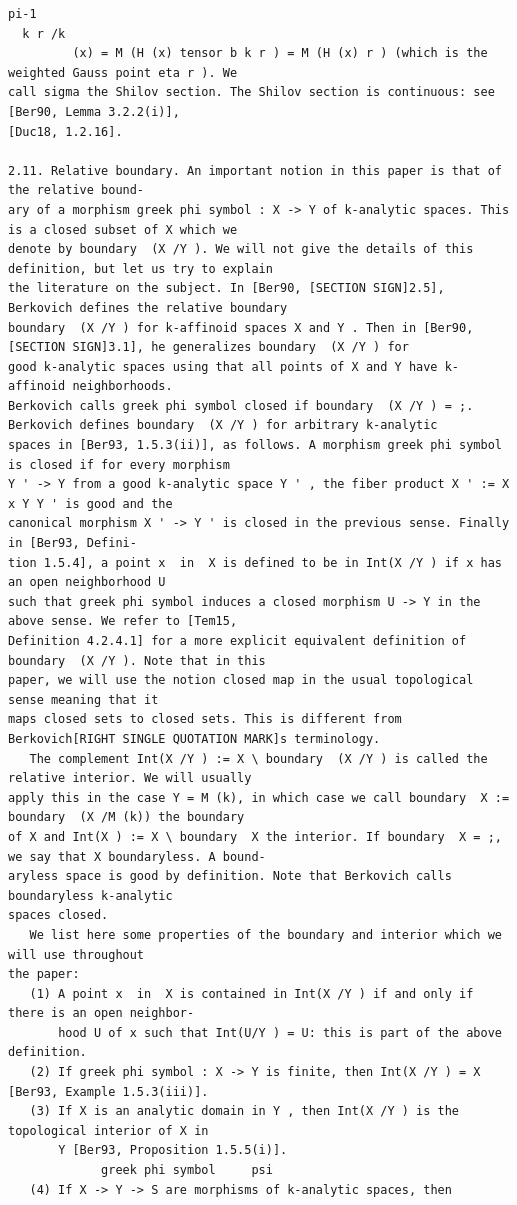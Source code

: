 \documentclass[
  11pt,
]{article}
\begin{document}
\begin{lstlisting}
pi-1
  k r /k
         (x) = M (H (x) tensor b k r ) = M (H (x) r ) (which is the weighted Gauss point eta r ). We
call sigma the Shilov section. The Shilov section is continuous: see [Ber90, Lemma 3.2.2(i)],
[Duc18, 1.2.16].

2.11. Relative boundary. An important notion in this paper is that of the relative bound-
ary of a morphism greek phi symbol : X -> Y of k-analytic spaces. This is a closed subset of X which we
denote by boundary  (X /Y ). We will not give the details of this definition, but let us try to explain
the literature on the subject. In [Ber90, [SECTION SIGN]2.5], Berkovich defines the relative boundary
boundary  (X /Y ) for k-affinoid spaces X and Y . Then in [Ber90, [SECTION SIGN]3.1], he generalizes boundary  (X /Y ) for
good k-analytic spaces using that all points of X and Y have k-affinoid neighborhoods.
Berkovich calls greek phi symbol closed if boundary  (X /Y ) = ;. Berkovich defines boundary  (X /Y ) for arbitrary k-analytic
spaces in [Ber93, 1.5.3(ii)], as follows. A morphism greek phi symbol is closed if for every morphism
Y ' -> Y from a good k-analytic space Y ' , the fiber product X ' := X  x Y Y ' is good and the
canonical morphism X ' -> Y ' is closed in the previous sense. Finally in [Ber93, Defini-
tion 1.5.4], a point x  in  X is defined to be in Int(X /Y ) if x has an open neighborhood U
such that greek phi symbol induces a closed morphism U -> Y in the above sense. We refer to [Tem15,
Definition 4.2.4.1] for a more explicit equivalent definition of boundary  (X /Y ). Note that in this
paper, we will use the notion closed map in the usual topological sense meaning that it
maps closed sets to closed sets. This is different from Berkovich[RIGHT SINGLE QUOTATION MARK]s terminology.
   The complement Int(X /Y ) := X \ boundary  (X /Y ) is called the relative interior. We will usually
apply this in the case Y = M (k), in which case we call boundary  X := boundary  (X /M (k)) the boundary
of X and Int(X ) := X \ boundary  X the interior. If boundary  X = ;, we say that X boundaryless. A bound-
aryless space is good by definition. Note that Berkovich calls boundaryless k-analytic
spaces closed.
   We list here some properties of the boundary and interior which we will use throughout
the paper:
   (1) A point x  in  X is contained in Int(X /Y ) if and only if there is an open neighbor-
       hood U of x such that Int(U/Y ) = U: this is part of the above definition.
   (2) If greek phi symbol : X -> Y is finite, then Int(X /Y ) = X [Ber93, Example 1.5.3(iii)].
   (3) If X is an analytic domain in Y , then Int(X /Y ) is the topological interior of X in
       Y [Ber93, Proposition 1.5.5(i)].
             greek phi symbol     psi
   (4) If X -> Y -> S are morphisms of k-analytic spaces, then


\end{lstlisting}
\end{document}

